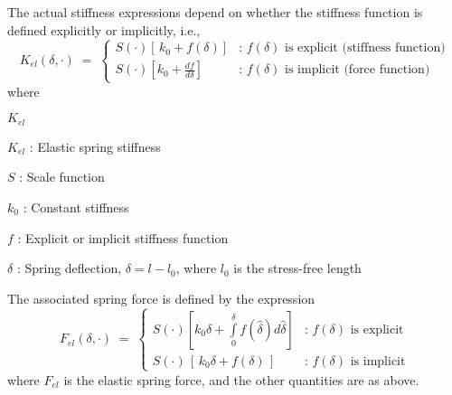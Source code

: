 The actual stiffness expressions depend on whether the stiffness function is
defined explicitly or implicitly, i.e.,
%
\begin{equation}
K_{el}(\delta,\cdot) \;=\; \left\{\begin{array}{ll}
S(\cdot)\left[\, k_0 + f(\delta) \right] &
\text{: $f(\delta)$ is explicit (stiffness function)} \\[1mm]
S(\cdot)\left[ k_0 + \frac{df}{d\delta} \right] &
\text{: $f(\delta)$ is implicit (force function)}
\end{array}\right.
\label{eq:spring stiffness}
\end{equation}
%
where
%
\begin{namelist}{$K_{el}$}
\item[$K_{el}$] : Elastic spring stiffness
\item[$S$]      : Scale function
\item[$k_0$]    : Constant stiffness
\item[$f$]      : Explicit or implicit stiffness function
\item[$\delta$] : Spring deflection, $\delta = l - l_0$,
where $l_0$ is the stress-free length
\end{namelist}
%
The associated spring force is defined by the expression
%
\begin{equation}
F_{el}(\delta,\cdot) \;=\; \left\{\begin{array}{ll}
S(\cdot)\left[k_0\delta + \int\limits_0^\delta f(\hat\delta)d\hat\delta\right] &
\text{: $f(\delta)$ is explicit} \\[5mm]
S(\cdot)\,\left[\,k_0\delta + f(\delta) \,\right] &
\text{: $f(\delta)$ is implicit}
\end{array}\right.
\label{eq:spring force}
\end{equation}
%
where $F_{el}$ is the elastic spring force,
and the other quantities are as above.


